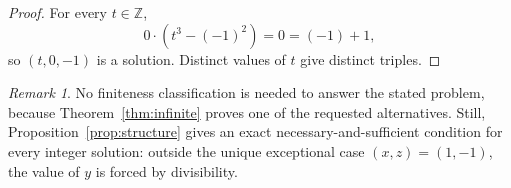 \documentclass[11pt]{article}
\theoremstyle{remark}
\newtheorem{remark}{Remark}
\newcommand{\Z}{\mathbb{Z}}
\begin{document}
\begin{proof}
For every $t\in\Z$,
\[
        0\cdot(t^3-(-1)^2)=0=(-1)+1,
\]
so $(t,0,-1)$ is a solution.  Distinct values of $t$ give distinct triples.
\end{proof}

\begin{remark}
No finiteness classification is needed to answer the stated problem, because
Theorem~\ref{thm:infinite} proves one of the requested alternatives.  Still,
Proposition~\ref{prop:structure} gives an exact necessary-and-sufficient
condition for every integer solution: outside the unique exceptional case
$(x,z)=(1,-1)$, the value of $y$ is forced by divisibility.
\end{remark}
\end{document}
